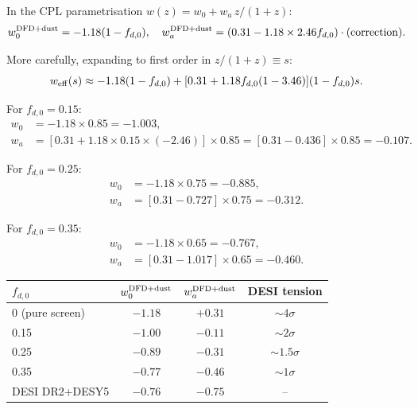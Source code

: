 \documentclass[11pt]{article}
\begin{document}
In the CPL parametrisation $w(z) = w_0 + w_a\,z/(1+z)$:
\begin{equation}
  w_0^{\rm DFD+dust} = -1.18(1-f_{d,0}), \quad
  w_a^{\rm DFD+dust} = (0.31 - 1.18\times 2.46 f_{d,0})\cdot\text{(correction)}.
\end{equation}

More carefully, expanding to first order in $z/(1+z) \equiv s$:
\begin{equation}
  w_{\rm eff}(s) \approx -1.18(1-f_{d,0}) + [0.31 + 1.18 f_{d,0}(1 - 3.46)](1-f_{d,0})s.
\end{equation}

For $f_{d,0} = 0.15$:
\begin{align}
  w_0 &= -1.18\times 0.85 = -1.003, \\
  w_a &= [0.31 + 1.18\times 0.15\times(-2.46)]\times 0.85
  = [0.31 - 0.436]\times 0.85 = -0.107.
\end{align}

For $f_{d,0} = 0.25$:
\begin{align}
  w_0 &= -1.18\times 0.75 = -0.885, \\
  w_a &= [0.31 - 0.727]\times 0.75 = -0.312.
\end{align}

For $f_{d,0} = 0.35$:
\begin{align}
  w_0 &= -1.18\times 0.65 = -0.767, \\
  w_a &= [0.31 - 1.017]\times 0.65 = -0.460.
\end{align}

\begin{center}
\begin{tabular}{lccc}
\toprule
$f_{d,0}$ & $w_0^{\rm DFD+dust}$ & $w_a^{\rm DFD+dust}$ & DESI tension \\
\midrule
0 (pure screen) & $-1.18$ & $+0.31$ & $\sim 4\sigma$ \\
0.15 & $-1.00$ & $-0.11$ & $\sim 2\sigma$ \\
0.25 & $-0.89$ & $-0.31$ & $\sim 1.5\sigma$ \\
0.35 & $-0.77$ & $-0.46$ & $\sim 1\sigma$ \\
DESI DR2+DESY5 & $-0.76$ & $-0.75$ & -- \\
\bottomrule
\end{tabular}
\end{center}
\end{document}
